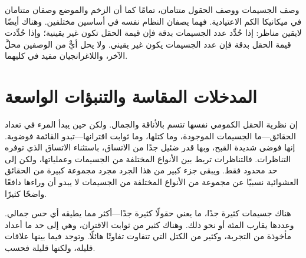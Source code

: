 \begin{classroomqa}
\end{classroomqa}

وصف الجسيمات ووصف الحقول متتامان، تمامًا كما أن الزخم والموضع وصفان متتامان في ميكانيكا الكم الاعتيادية. فهما يصفان النظام نفسه في أساسين مختلفين. وهناك أيضًا لايقين مناظر: إذا حُدِّد عدد الجسيمات بدقة فإن قيمة الحقل تكون غير يقينية؛ وإذا حُدِّدت قيمة الحقل بدقة فإن عدد الجسيمات يكون غير يقيني. ولا يحل أيٌّ من الوصفين محلَّ الآخر، واللاغرانجيان مفيد في كليهما.

\begin{classroomqa}
\end{classroomqa}

\section{المدخلات المقاسة والتنبؤات الواسعة}

إن نظرية الحقل الكمومي نفسها تتسم بالأناقة والجمال. ولكن حين يبدأ المرء في تعداد الحقائق---ما الجسيمات الموجودة، وما كتلها، وما ثوابت اقترانها---تبدو القائمة فوضوية. إنها فوضى شديدة القبح، وبها قدر ضئيل جدًا من الاتساق، باستثناء الاتساق الذي توفره التناظرات. فالتناظرات تربط بين الأنواع المختلفة من الجسيمات وعملياتها، ولكن إلى حد محدود فقط. ويبقى جزء كبير من هذا الجرد مجرد مجموعة كبيرة من الحقائق العشوائية نسبيًا عن مجموعة من الأنواع المختلفة من الجسيمات لا يبدو أن وراءها دافعًا واضحًا كثيرًا.

\begin{classroomqa}
\end{classroomqa}

هناك جسيمات كثيرة جدًا، ما يعني حقولًا كثيرة جدًا---أكثر مما يطيقه أي حس جمالي. وعددها يقارب المئة أو نحو ذلك. وهناك كثير من ثوابت الاقتران، وهي إلى حد ما أعداد مأخوذة من التجربة، وكثير من الكتل التي تتفاوت تفاوتًا هائلًا. وتوجد فيما بينها علاقات قليلة، ولكنها قليلة فحسب.

